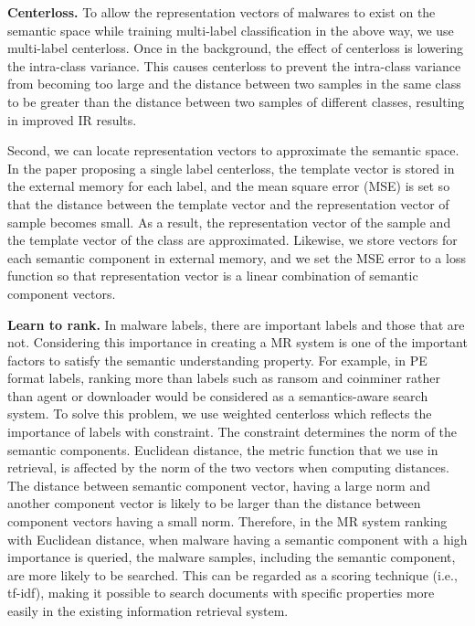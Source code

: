 \textbf{Centerloss. }
To allow the representation vectors of malwares to exist on the semantic space while training multi-label classification in the above way, we use multi-label centerloss. Once in the background, the effect of centerloss is lowering the intra-class variance. This causes centerloss to prevent the intra-class variance from becoming too large and the distance between two samples in the same class to be greater than the distance between two samples of different classes, resulting in improved IR results.

Second, we can locate representation vectors to approximate the semantic space. In the paper proposing a single label centerloss, the template vector is stored in the external memory for each label, and the mean square error (MSE) is set so that the distance between the template vector and the representation vector of sample becomes small. As a result, the representation vector of the sample and the template vector of the class are approximated. Likewise, we store vectors for each semantic component in external memory, and we set the MSE error to a loss function so that representation vector is a linear combination of semantic component vectors.




\textbf{Learn to rank. }
In malware labels, there are important labels and those that are not. Considering this importance in creating a MR system is one of the important factors to satisfy the semantic understanding property. For example, in PE format labels, ranking more than labels such as ransom and coinminer rather than agent or downloader would be considered as a semantics-aware search system. To solve this problem, we use weighted centerloss which reflects the importance of labels with constraint. The constraint determines the norm of the semantic components. Euclidean distance, the metric function that we use in retrieval, is affected by the norm of the two vectors when computing distances. The distance between semantic component vector, having a large norm and another component vector is likely to be larger than the distance between component vectors having a small norm. Therefore, in the MR system ranking with Euclidean distance, when malware having a semantic component with a high importance is queried, the malware samples, including the semantic component, are more likely to be searched. This can be regarded as a scoring technique (i.e., tf-idf\cite{baeza1999modern}), making it possible to search documents with specific properties more easily in the existing information retrieval system.
 

